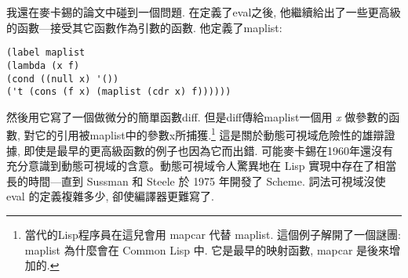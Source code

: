 \documentclass[12pt]{article}
\begin{document}
\begin{CJK}{UTF8}{bsmi}
我還在麥卡錫的論文中碰到一個問題. 
在定義了eval之後, 
他繼續給出了一些更高級的函數---接受其它函數作為引數的函數. 
他定義了maplist: 
\begin{verbatim} 
(label maplist 
(lambda (x f) 
(cond ((null x) '()) 
('t (cons (f x) (maplist (cdr x) f)))))) 
\end{verbatim} 
然後用它寫了一個做微分的簡單函數diff. 
但是diff傳給maplist一個用 {\it x} 做參數的函數, 
對它的引用被maplist中的參數x所捕獲.\footnote{當代的Lisp程序員在這兒會用
mapcar 代替 maplist. 
這個例子解開了一個謎團: 
maplist 為什麼會在 Common Lisp 中. 
它是最早的映射函數, mapcar 是後來增加的.} 
這是關於動態可視域危險性的雄辯證據, 
即使是最早的更高級函數的例子也因為它而出錯. 
可能麥卡錫在1960年還沒有充分意識到動態可視域的含意。動態可視域令人驚異地在
Lisp 實現中存在了相當長的時間---直到 Sussman 和 Steele 於 1975 年開發了 Scheme. 
詞法可視域沒使 eval 的定義複雜多少, 卻使編譯器更難寫了. 
\newpage 
\end{CJK} 
\end{document}
